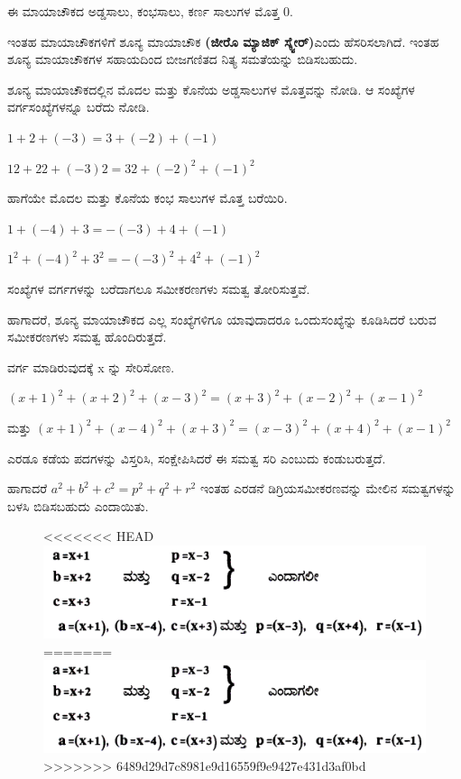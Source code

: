 ಈ ಮಾಯಾಚೌಕದ ಅಡ್ಡಸಾಲು, ಕಂಭಸಾಲು, ಕರ್ಣ ಸಾಲುಗಳ ಮೊತ್ತ 0.

ಇಂತಹ ಮಾಯಾಚೌಕಗಳಿಗೆ ಶೂನ್ಯ ಮಾಯಾಚೌಕ \textbf{(ಜೀರೊ ಮ್ಯಾಜಿಕ್ ಸ್ಕ್ವೇರ್)}\break ಎಂದು ಹೆಸರಿಸಲಾಗಿದೆ. ಇಂತಹ ಶೂನ್ಯ ಮಾಯಾಚೌಕಗಳ ಸಹಾಯದಿಂದ ಬೀಜಗಣಿತದ ನಿತ್ಯ ಸಮತೆಯನ್ನು ಬಿಡಿಸಬಹುದು.

ಶೂನ್ಯ ಮಾಯಾಚೌಕದಲ್ಲಿನ ಮೊದಲ ಮತ್ತು ಕೊನೆಯ ಅಡ್ಡಸಾಲುಗಳ ಮೊತ್ತವನ್ನು ನೋಡಿ. ಆ ಸಂಖ್ಯೆಗಳ ವರ್ಗಸಂಖ್ಯೆಗಳನ್ನೂ ಬರೆದು ನೋಡಿ.

$1+2+(-3) =3+(-2)+(-1)$

$12+22+(-3) 2 =32+(-2)^2 +(-1)^2$

ಹಾಗೆಯೇ ಮೊದಲ ಮತ್ತು ಕೊನೆಯ ಕಂಭ ಸಾಲುಗಳ ಮೊತ್ತ ಬರೆಯಿರಿ.

$1+(-4)+3 = -(-3)+4+(-1)$

$1^2+(-4)^2 +3^2 =-(-3)^2+4^2 +(-1)^2$

ಸಂಖ್ಯೆಗಳ ವರ್ಗಗಳನ್ನು ಬರೆದಾಗಲೂ ಸಮೀಕರಣಗಳು ಸಮತ್ವ ತೋರಿಸುತ್ತವೆ.

ಹಾಗಾದರೆ, ಶೂನ್ಯ ಮಾಯಾಚೌಕದ ಎಲ್ಲ ಸಂಖ್ಯೆಗಳಿಗೂ ಯಾವುದಾದರೂ ಒಂದು\break ಸಂಖ್ಯೆನ್ನು ಕೂಡಿಸಿದರೆ ಬರುವ ಸಮೀಕರಣಗಳು ಸಮತ್ವ ಹೊಂದಿರುತ್ತದೆ.

ವರ್ಗ ಮಾಡಿರುವುದಕ್ಕೆ x ನ್ನು ಸೇರಿಸೋಣ.

$(x+1)^2+(x+2)^2+(x-3)^2 = (x+3)^2+(x-2)^2+(x-1)^2$

ಮತ್ತು $(x+1)^2+(x-4)^2+(x+3)^2 = (x-3)^2+(x+4)^2+(x-1)^2$

ಎರಡೂ ಕಡೆಯ ಪದಗಳನ್ನು ವಿಸ್ತರಿಸಿ, ಸಂಕ್ಷೇಪಿಸಿದರೆ ಈ ಸಮತ್ವ ಸರಿ ಎಂಬುದು ಕಂಡುಬರುತ್ತದೆ.

ಹಾಗಾದರೆ $a^2+b^2+c^2 = p^2+q^2+r^2$ ಇಂತಹ ಎರಡನೆ ಡಿಗ್ರಿಯ\break ಸಮೀಕರಣವನ್ನು ಮೇಲಿನ ಸಮತ್ವಗಳನ್ನು ಬಳಸಿ ಬಿಡಿಸಬಹುದು ಎಂದಾಯಿತು.
\begin{figure}[H]
<<<<<<< HEAD
\includegraphics{src/figures/chap10/fig10-3.jpg}
=======
\includegraphics[scale=.9]{src/figures/chap10/fig10.3.jpg}
>>>>>>> 6489d29d7c8981e9d16559f9e9427e431d3af0bd
\end{figure}


